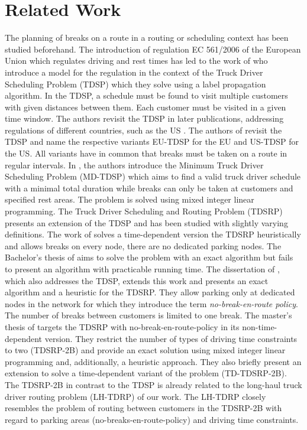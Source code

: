 
\chapter{Related Work\label{ch:related_work}}
The planning of breaks on a route in a routing or scheduling context has been studied beforehand. The introduction of regulation EC 561/2006 of the European Union \cite{europeanparliament:2006} which regulates driving and rest times has led to the work of \cite{goel:2009} who introduce a model for the regulation in the context of the Truck Driver Scheduling Problem (TDSP) which they solve using a label propagation algorithm. In the TDSP, a schedule must be found to visit multiple customers with given distances between them. Each customer must be visited in a given time window. The authors revisit the TDSP in later publications, addressing regulations of different countries, such as the US \cite{goel:2012}. The authors of \cite{sartori:20210107} revisit the TDSP and name the respective variants EU-TDSP for the EU and US-TDSP for the US. All variants have in common that breaks must be taken on a route in regular intervals. In \cite{goel:2012a}, the authors introduce the Minimum Truck Driver Scheduling Problem (MD-TDSP) which aims to find a valid truck driver schedule with a minimal total duration while breaks can only be taken at customers and specified rest areas. The problem is solved using mixed integer linear programming. The Truck Driver Scheduling and Routing Problem (TDSRP) presents an extension of the TDSP and has been studied with slightly varying definitions. The work of \cite{shah:2008} solves a time-dependent version the TDSRP heuristically and allows breaks on every node, there are no dedicated parking nodes. The Bachelor's thesis of \cite{braeuer:2016} aims to solve the problem with an exact algorithm but fails to present an algorithm with practicable running time. The dissertation of \cite{kleff:2019}, which also addresses the TDSP, extends this work and presents an exact algorithm and a heuristic for the TDSRP. They allow parking only at dedicated nodes in the network for which they introduce the term \emph{no-break-en-route policy}. The number of breaks between customers is limited to one break. The master's thesis of \cite{bomsdorf:2020} targets the TDSRP with no-break-en-route-policy in its non-time-dependent version. They restrict the number of types of driving time constraints to two (TDSRP-2B) and provide an exact solution using mixed integer linear programming and, additionally, a heuristic approach. They also briefly present an extension to solve a time-dependent variant of the problem (TD-TDSRP-2B). The TDSRP-2B in contrast to the TDSP is already related to the long-haul truck driver routing problem (LH-TDRP) of our work. The LH-TDRP closely resembles the problem of routing between customers in the TDSRP-2B with regard to parking areas (no-breaks-en-route-policy) and driving time constraints.

